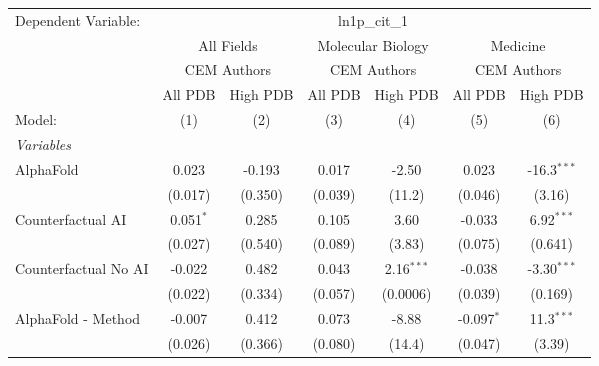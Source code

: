 \begingroup
\centering
\begin{tabular}{lcccccc}
   \tabularnewline \midrule \midrule
   Dependent Variable: & \multicolumn{6}{c}{ln1p\_cit\_1}\\
 & \multicolumn{2}{c}{All Fields} & \multicolumn{2}{c}{Molecular Biology} & \multicolumn{2}{c}{Medicine} \\
\cmidrule(lr){2-3} \cmidrule(lr){4-5} \cmidrule(lr){6-7}
 & \multicolumn{2}{c}{CEM Authors} & \multicolumn{2}{c}{CEM Authors} & \multicolumn{2}{c}{CEM Authors} \\
\cmidrule(lr){2-3} \cmidrule(lr){4-5} \cmidrule(lr){6-7}
 & \multicolumn{1}{c}{All PDB} & \multicolumn{1}{c}{High PDB} & \multicolumn{1}{c}{All PDB} & \multicolumn{1}{c}{High PDB} & \multicolumn{1}{c}{All PDB} & \multicolumn{1}{c}{High PDB} \\
\cmidrule(lr){2-2} \cmidrule(lr){3-3} \cmidrule(lr){4-4} \cmidrule(lr){5-5} \cmidrule(lr){6-6} \cmidrule(lr){7-7}
   Model:                                                     & (1)            & (2)     & (3)            & (4)          & (5)          & (6)\\  
   \midrule
   \emph{Variables}\\
   AlphaFold                                                  & 0.023          & -0.193  & 0.017          & -2.50        & 0.023        & -16.3$^{***}$\\   
                                                              & (0.017)        & (0.350) & (0.039)        & (11.2)       & (0.046)      & (3.16)\\   
   Counterfactual AI                                          & 0.051$^{*}$    & 0.285   & 0.105          & 3.60         & -0.033       & 6.92$^{***}$\\   
                                                              & (0.027)        & (0.540) & (0.089)        & (3.83)       & (0.075)      & (0.641)\\   
   Counterfactual No AI                                       & -0.022         & 0.482   & 0.043          & 2.16$^{***}$ & -0.038       & -3.30$^{***}$\\   
                                                              & (0.022)        & (0.334) & (0.057)        & (0.0006)     & (0.039)      & (0.169)\\   
   AlphaFold - Method                                         & -0.007         & 0.412   & 0.073          & -8.88        & -0.097$^{*}$ & 11.3$^{***}$\\   
                                                              & (0.026)        & (0.366) & (0.080)        & (14.4)       & (0.047)      & (3.39)\\   

\end{tabular}
